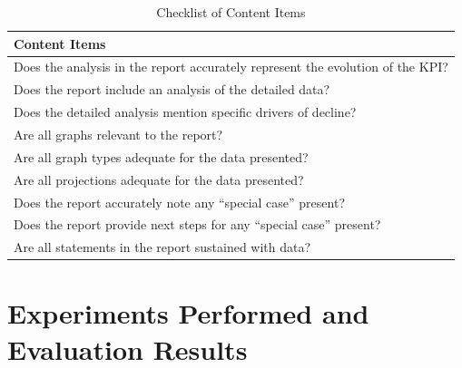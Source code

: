\documentclass[a4paper]{report}
\begin{document}
\begin{table}[H]
\centering
\begin{tabular}{|p{14cm}|}
    \hline
    \textbf{Content Items} \\ \hline
    Does the analysis in the report accurately represent the evolution of the KPI? \\ \hline
    Does the report include an analysis of the detailed data? \\ \hline
    Does the detailed analysis mention specific drivers of decline? \\ \hline
    Are all graphs relevant to the report? \\ \hline
    Are all graph types adequate for the data presented? \\ \hline
    Are all projections adequate for the data presented? \\ \hline
    Does the report accurately note any ``special case'' present? \\ \hline
    Does the report provide next steps for any ``special case'' present? \\ \hline
Are all statements in the report sustained with data? \\ \hline
\end{tabular}
\caption{Checklist of Content Items}
\end{table}

\chapter{Experiments Performed and Evaluation Results}
\label{annex:experiments}
\end{document}
